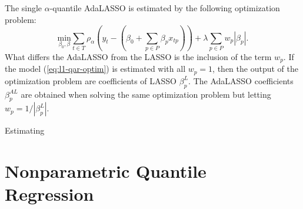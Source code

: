 The single $\alpha$-quantile AdaLASSO is estimated by the following optimization problem:
\begin{equation}
\underset{\beta_{0},\beta}{\text{min}} \sum_{t \in T} \rho_\alpha(y_t - (\beta_0 + \sum_{p \in P} \beta_p x_{tp})) +\lambda \sum_{p \in P} w_p | \beta_p |.\label{eq:l1-qar-optim} 
\end{equation}
What differs the AdaLASSO from the LASSO is the inclusion of the term $w_p$. If the model (\ref{eq:l1-qar-optim}) is estimated with all $w_{p}=1$, then the output of the optimization problem are coefficients of LASSO  $\beta^{L}_{p}$. The AdaLASSO coefficients $\beta^{AL}_{p}$ are obtained when solving the same optimization problem but letting $w_{p}=1/|\beta^{L}_{p}|$. 

Estimating




\section{Nonparametric Quantile Regression}
\label{sec:npqar}

